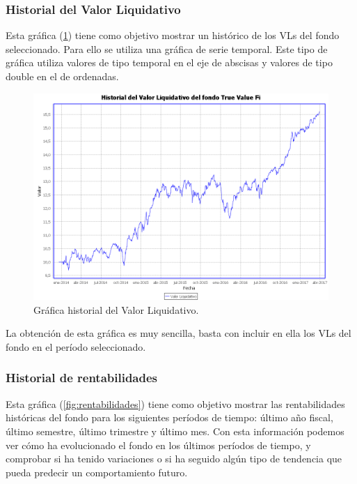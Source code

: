\documentclass[12pt, a4paper]{book}
\begin{document}
\subsubsection{Historial del Valor Liquidativo}

Esta gráfica (\ref{fig:historial}) tiene como objetivo mostrar un histórico de los \gls{VL}s del fondo seleccionado. Para ello se utiliza una gráfica de serie temporal. Este tipo de gráfica utiliza valores de tipo temporal en el eje de abscisas y valores de tipo double en el de ordenadas.\\

	\begin{figure}[htbp]
	\centering
	\includegraphics[width=\textwidth]{figuras/historial.PNG}
	\caption{Gráfica historial del Valor Liquidativo.}
	\label{fig:historial}
	\end {figure}

La obtención de esta gráfica es muy sencilla, basta con incluir en ella los \gls{VL}s del fondo en el período seleccionado.

\newpage

\subsubsection{Historial de rentabilidades}

Esta gráfica (\ref{fig:rentabilidades}) tiene como objetivo mostrar las rentabilidades históricas del fondo para los siguientes períodos de tiempo: último año fiscal, último semestre, último trimestre y último mes. Con esta información podemos ver cómo ha evolucionado el fondo en los últimos períodos de tiempo, y comprobar si ha tenido variaciones o si ha seguido algún tipo de tendencia que pueda predecir un comportamiento futuro.\\
\end{document}
